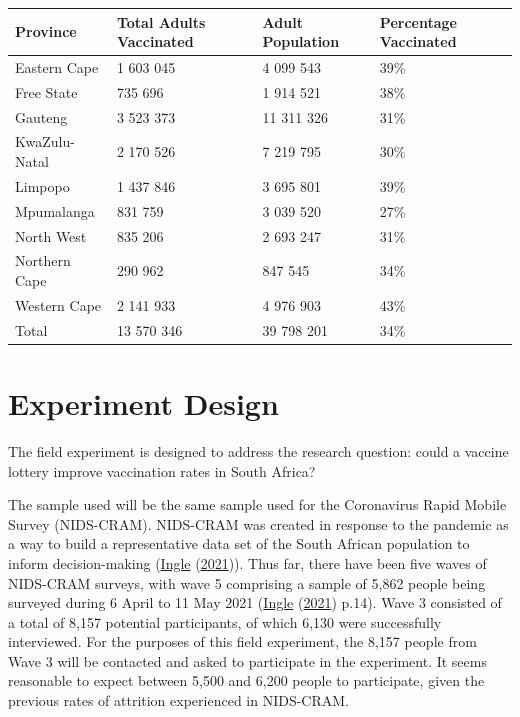 \documentclass[11pt,preprint, authoryear]{elsarticle}
\let\origtable\table
\let\endorigtable\endtable
\renewenvironment{table}[1][2] {
    \expandafter\origtable\expandafter[H]
} {
    \endorigtable
}
\numberwithin{equation}{section}
\numberwithin{figure}{section}
\numberwithin{table}{section}
\begin{document}
\begin{table}[H]
\centering
\begin{tabular}{llll}
  \toprule
Province & Total Adults Vaccinated & Adult Population & Percentage Vaccinated \\ 
  \midrule
Eastern Cape & 1 603 045 & 4 099 543 & 39\% \\ 
  Free State & 735 696 & 1 914 521 & 38\% \\ 
  Gauteng & 3 523 373 & 11 311 326 & 31\% \\ 
  KwaZulu-Natal & 2 170 526 & 7 219 795 & 30\% \\ 
  Limpopo & 1 437 846 & 3 695 801 & 39\% \\ 
  Mpumalanga & 831 759 & 3 039 520 & 27\% \\ 
  North West & 835 206 & 2 693 247 & 31\% \\ 
  Northern Cape & 290 962 & 847 545 & 34\% \\ 
  Western Cape & 2 141 933 & 4 976 903 & 43\% \\ 
  Total & 13 570 346 & 39 798 201 & 34\% \\ 
   \bottomrule
\end{tabular}
\caption{Vaccination Statistics \label{tab1}} 
\end{table}

\hypertarget{experiment-design}{%
\section{\texorpdfstring{Experiment Design
\label{design}}{Experiment Design }}\label{experiment-design}}

The field experiment is designed to address the research question: could
a vaccine lottery improve vaccination rates in South Africa?

The sample used will be the same sample used for the Coronavirus Rapid
Mobile Survey (NIDS-CRAM). NIDS-CRAM was created in response to the
pandemic as a way to build a representative data set of the South
African population to inform decision-making
(\protect\hyperlink{ref-nids}{Ingle}
(\protect\hyperlink{ref-nids}{2021})). Thus far, there have been five
waves of NIDS-CRAM surveys, with wave 5 comprising a sample of 5,862
people being surveyed during 6 April to 11 May 2021
(\protect\hyperlink{ref-nids}{Ingle}
(\protect\hyperlink{ref-nids}{2021}) p.14). Wave 3 consisted of a total
of 8,157 potential participants, of which 6,130 were successfully
interviewed. For the purposes of this field experiment, the 8,157 people
from Wave 3 will be contacted and asked to participate in the
experiment. It seems reasonable to expect between 5,500 and 6,200 people
to participate, given the previous rates of attrition experienced in
NIDS-CRAM.
\end{document}
